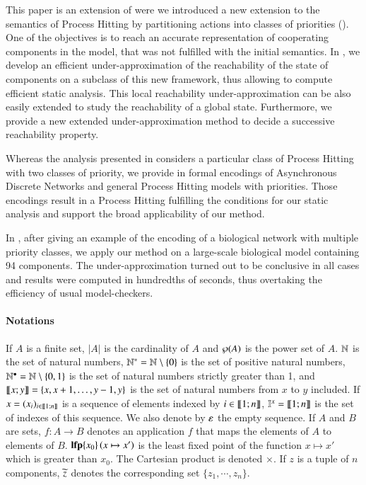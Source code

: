 This paper is an extension of \cite{FPMR13-CS2Bio} were we
introduced a new extension to the semantics of Process Hitting by partitioning actions into classes of priorities
().
One of the objectives is to reach an accurate representation of cooperating components in the model, that was not fulfilled with the initial semantics.
In ,
we develop an efficient under-approximation of the reachability of the state of components on a subclass of this new framework, thus allowing to compute efficient static analysis.
This local reachability under-approximation can be also easily extended to study the reachability of a global state.
Furthermore, we provide a new extended under-approximation method to decide a successive reachability property.

Whereas the analysis presented in  considers a particular class of
Process Hitting with two classes of priority,
we provide in  formal encodings of Asynchronous Discrete Networks and general
Process Hitting models with priorities.
Those encodings result in a Process Hitting fulfilling the conditions for our
static analysis and support the broad applicability of our method.

In , after giving an example of the encoding of a biological
network with multiple priority classes,
we apply our method on a large-scale biological model containing 94 components.
The under-approximation turned out to be conclusive in all cases and results were computed in hundredths of seconds,
thus overtaking the efficiency of usual model-checkers.



\paragraph*{Notations}

If $A$ is a finite set,
$|A|$ is the cardinality of $A$
and $\wp(A)$ is the power set of $A$.
$\mathbb{N}$ is the set of natural numbers,
$\mathbb{N}^* = \mathbb{N} \setminus \{ 0 \}$ is the set of positive natural numbers,
$\mathbb{N}^\bullet = \mathbb{N} \setminus \{ 0, 1 \}$ is the set of natural numbers strictly greater than 1,
and $\llbracket x; y \rrbracket = \{ x, x+1, \dots, y-1, y \}$ is the set of natural numbers from $x$ to $y$ included.
If $x = (x_i)_{i \in \llbracket 1; n \rrbracket}$ is a sequence of elements indexed by $i \in \llbracket 1; n \rrbracket$,
$\mathbb{I}^{x} = \llbracket 1; n \rrbracket$ is the set of indexes of this sequence.
We also denote by $\varepsilon$ the empty sequence.
If $A$ and $B$ are sets,
$f : A \rightarrow B$ denotes an application $f$ that maps the elements of $A$ to elements of $B$.
$\mathbf{lfp}\{x_0\}\left(x\mapsto x'\right)$ is the least fixed point of the function $x \mapsto x'$ which is greater than $x_0$.
The Cartesian product is denoted $\times$.
If $z$ is a tuple of $n$ components, $\widetilde{z}$ denotes the corresponding set
	$\{z_1, \cdots, z_n\}$.
